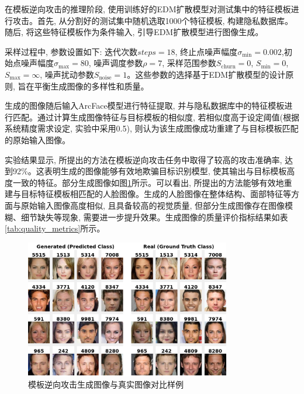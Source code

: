 在模板逆向攻击的推理阶段, 使用训练好的EDM扩散模型对测试集中的特征模板进行攻击。首先, 从分割好的测试集中随机选取1000个特征模板, 构建隐私数据库。随后, 将这些特征模板作为条件输入, 引导EDM扩散模型进行图像生成。

采样过程中, 参数设置如下: 迭代次数$steps = 18$,
终止点噪声幅度$\sigma_{\text{min}} = 0.002$,初始点噪声幅度$\sigma_{\text{max}} = 80$, 噪声调度参数$\rho = 7 $, 采样范围参数$S_{\text{churn}} = 0$, $S_{\text{min}} = 0$, $S_{\text{max}} = \infty$, 噪声扰动参数$S_{\text{noise}} = 1$。这些参数的选择基于EDM扩散模型的设计原则, 旨在平衡生成图像的多样性和质量。

生成的图像随后输入ArcFace模型进行特征提取, 并与隐私数据库中的特征模板进行匹配。通过计算生成图像特征与目标模板的相似度, 若相似度高于设定阈值(根据系统精度需求设定, 实验中采用0.5), 则认为该生成图像成功重建了与目标模板匹配的原始输入图像。


实验结果显示, 所提出的方法在模板逆向攻击任务中取得了较高的攻击准确率, 达到92\%。这表明生成的图像能够有效地欺骗目标识别模型, 使其输出与目标模板高度一致的特征。部分生成图像如图\ref{fig:edm_tia_sample}所示。可以看出, 所提出的方法能够有效地重建与目标特征模板相匹配的人脸图像。生成的人脸图像在整体结构、面部特征等方面与原始输入图像高度相似, 且具备较高的视觉质量, 但部分生成图像存在图像模糊、细节缺失等现象, 需要进一步提升效果。生成图像的质量评价指标结果如表\ref{tab:quality_metrics}所示。

\begin{figure}[!htbp]
  \centering
  \includegraphics[width=0.8\textwidth]{images/gen_vs_real_matrix.png}
  \caption{模板逆向攻击生成图像与真实图像对比样例}
  \label{fig:edm_tia_sample}
\end{figure}

